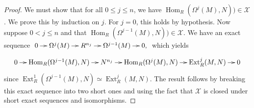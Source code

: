 \documentclass[10pt,a4paper]{amsart}
\newcommand\Ext{\operatorname{Ext}}
\newcommand\Hom{\operatorname{Hom}}
\begin{document}
\begin{proof}
    We must show that for all $0\leq j \leq n$, we have  $\Hom_R(\Omega^j(M), N)) \in \mathcal{X}$. We prove this by induction on $j$. For $j=0$, this holds by hypothesis. Now suppose  $0<j\leq n$ and that $\Hom_R(\Omega^{j-1}(M), N))\in\mathcal{X}$. We have an exact sequence
    $\xymatrix@=1em{0 \ar[r] & \Omega^{j}(M) \ar[r] & R^{n_j} \ar[r] & \Omega^{j-1}(M) \ar[r] & 0,}  $
    which yields 
    $$\xymatrix@=1em{
    0\ar[r] & \Hom_R(\Omega^{j-1}(M),N)\ar[r] & N^{n_j}\ar[r] & \Hom_R(\Omega^j(M),N)\ar[r] & \Ext^j_R(M,N)\ar[r] & 0
    }$$
    since $\Ext^1_R(\Omega^{j-1}(M),N)\simeq\Ext^j_R(M,N)$. The result follows by breaking this exact sequence into two short ones and using the fact that $\mathcal{X}$ is closed under short exact sequences and isomorphisms.
    

\end{proof}
\end{document}
